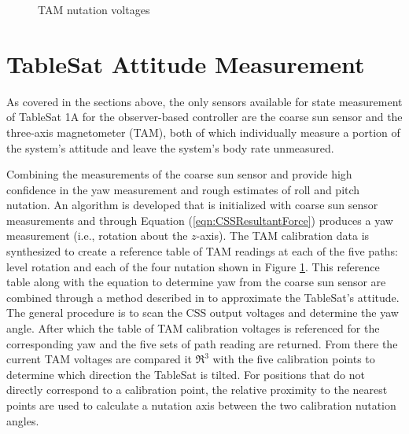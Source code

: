 \begin{figure}[H]
  \centerline{}
  \caption{TAM nutation voltages}
  \label{fig:TAMNutationVoltages}
\end{figure}

\section{TableSat Attitude Measurement}
\label{subsec:StateMeasurement}

As covered in the sections above, the only sensors available for state measurement of TableSat 1A for the observer-based controller are the coarse sun sensor and the three-axis magnetometer (TAM), both of which individually measure a portion of the system's attitude and leave the system's body rate unmeasured.

Combining the measurements of the coarse sun sensor and provide high confidence in the yaw measurement and rough estimates of roll and pitch nutation.  An algorithm is developed that is initialized with coarse sun sensor measurements and through Equation (\ref{eqn:CSSResultantForce}) produces a yaw measurement (i.e., rotation about the $z$-axis).  The TAM calibration data is synthesized to create a reference table of TAM readings at each of the five paths: level rotation and each of the four nutation shown in Figure \ref{fig:TAMNutationVoltages}.  This reference table along with the equation to determine yaw from the coarse sun sensor are combined through a method described in \label{subsec:CalculateTAMNutationReferenceData} to approximate the TableSat's attitude.  The general procedure is to scan the CSS output voltages and determine the yaw angle.  After which the table of TAM calibration voltages is referenced for the corresponding yaw and the five sets of path reading are returned.  From there the current TAM voltages are compared it $\Re^3$ with the five calibration points to determine which direction the TableSat is tilted.  For positions that do not directly correspond to a calibration point, the relative proximity to the nearest points are used to calculate a nutation axis between the two calibration nutation angles.
